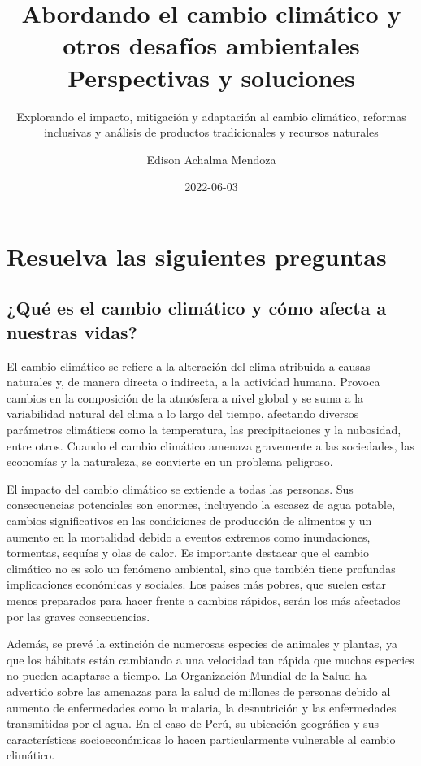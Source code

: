 \documentclass[
  letterpaper,
  DIV=11,
  numbers=noendperiod]{scrartcl}
\title{Abordando el cambio climático y otros desafíos ambientales
Perspectivas y soluciones}
\subtitle{Explorando el impacto, mitigación y adaptación al cambio
climático, reformas inclusivas y análisis de productos tradicionales y
recursos naturales}
\author{Edison Achalma Mendoza}
\date{2022-06-03}
\begin{document}
\maketitle
\ifdefined\Shaded\renewenvironment{Shaded}{\begin{tcolorbox}[breakable, frame hidden, interior hidden, enhanced, boxrule=0pt, borderline west={3pt}{0pt}{shadecolor}, sharp corners]}{\end{tcolorbox}}\fi

\hypertarget{resuelva-las-siguientes-preguntas}{%
\section{Resuelva las siguientes
preguntas}\label{resuelva-las-siguientes-preguntas}}

\hypertarget{quuxe9-es-el-cambio-climuxe1tico-y-cuxf3mo-afecta-a-nuestras-vidas}{%
\subsection{¿Qué es el cambio climático y cómo afecta a nuestras
vidas?}\label{quuxe9-es-el-cambio-climuxe1tico-y-cuxf3mo-afecta-a-nuestras-vidas}}

El cambio climático se refiere a la alteración del clima atribuida a
causas naturales y, de manera directa o indirecta, a la actividad
humana. Provoca cambios en la composición de la atmósfera a nivel global
y se suma a la variabilidad natural del clima a lo largo del tiempo,
afectando diversos parámetros climáticos como la temperatura, las
precipitaciones y la nubosidad, entre otros. Cuando el cambio climático
amenaza gravemente a las sociedades, las economías y la naturaleza, se
convierte en un problema peligroso.

El impacto del cambio climático se extiende a todas las personas. Sus
consecuencias potenciales son enormes, incluyendo la escasez de agua
potable, cambios significativos en las condiciones de producción de
alimentos y un aumento en la mortalidad debido a eventos extremos como
inundaciones, tormentas, sequías y olas de calor. Es importante destacar
que el cambio climático no es solo un fenómeno ambiental, sino que
también tiene profundas implicaciones económicas y sociales. Los países
más pobres, que suelen estar menos preparados para hacer frente a
cambios rápidos, serán los más afectados por las graves consecuencias.

Además, se prevé la extinción de numerosas especies de animales y
plantas, ya que los hábitats están cambiando a una velocidad tan rápida
que muchas especies no pueden adaptarse a tiempo. La Organización
Mundial de la Salud ha advertido sobre las amenazas para la salud de
millones de personas debido al aumento de enfermedades como la malaria,
la desnutrición y las enfermedades transmitidas por el agua. En el caso
de Perú, su ubicación geográfica y sus características socioeconómicas
lo hacen particularmente vulnerable al cambio climático.
\end{document}
